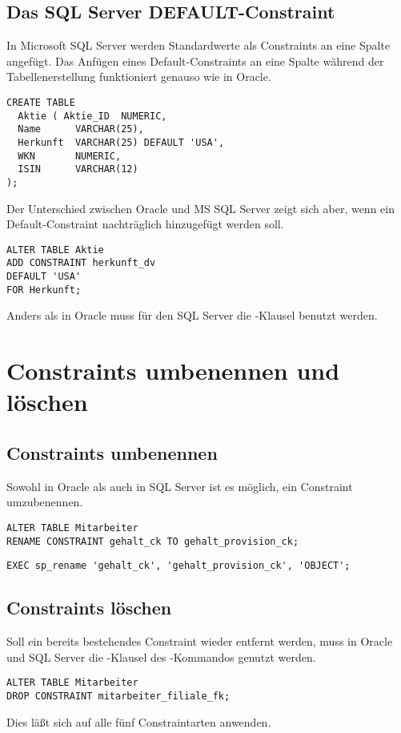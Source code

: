       \subsection{Das SQL Server DEFAULT-Constraint}
        In Microsoft SQL Server werden Standardwerte als Constraints an eine
        Spalte angefügt. Das Anfügen eines Default-Constraints an eine Spalte
        während der Tabellenerstellung funktioniert genauso wie in Oracle.
          \begin{lstlisting}[language=ms_sql,caption={Erstellen
          einer Tabelle mit einem Standardwert},label=sql09_18a]
CREATE TABLE
  Aktie ( Aktie_ID  NUMERIC,
  Name      VARCHAR(25),
  Herkunft  VARCHAR(25) DEFAULT 'USA',
  WKN       NUMERIC,
  ISIN      VARCHAR(12)
);
          \end{lstlisting}
		  \clearpage
          Der Unterschied zwischen Oracle und MS SQL Server zeigt sich aber, wenn ein Default-Constraint nachträglich hinzugefügt werden soll.
          \begin{lstlisting}[language=ms_sql,caption={Tabellenspalte mit
          Standardwert hinzufügen in SQL Server},label=sql09_18b] 
ALTER TABLE Aktie
ADD CONSTRAINT herkunft_dv
DEFAULT 'USA'
FOR Herkunft;
          \end{lstlisting}
          Anders als in Oracle muss für den SQL Server die -Klausel benutzt werden.
    \section{Constraints umbenennen und löschen}
      \subsection{Constraints umbenennen}
        Sowohl in Oracle als auch in SQL Server ist es möglich, ein Constraint umzubenennen.
        \begin{lstlisting}[language=oracle_sql,caption={Ein Constraint umbenennen in Oracle},label=sql09_19]
ALTER TABLE Mitarbeiter
RENAME CONSTRAINT gehalt_ck TO gehalt_provision_ck;
        \end{lstlisting}
        \begin{lstlisting}[language=ms_sql,caption={Ein Constraint umbenennen in SQL Server},label=sql09_20,emphstyle={[9]\color{red}},emph={[9]sp_rename}]
EXEC sp_rename 'gehalt_ck', 'gehalt_provision_ck', 'OBJECT';
        \end{lstlisting}
      \subsection{Constraints löschen}
        Soll ein bereits bestehendes Constraint wieder entfernt werden, muss in Oracle und SQL Server die -Klausel des -Kommandos genutzt werden.
        \begin{lstlisting}[language=oracle_sql,caption={Ein Constraint löschen},label=sql09_21]
ALTER TABLE Mitarbeiter
DROP CONSTRAINT mitarbeiter_filiale_fk;
        \end{lstlisting}
        Dies läßt sich auf alle fünf Constraintarten anwenden.

